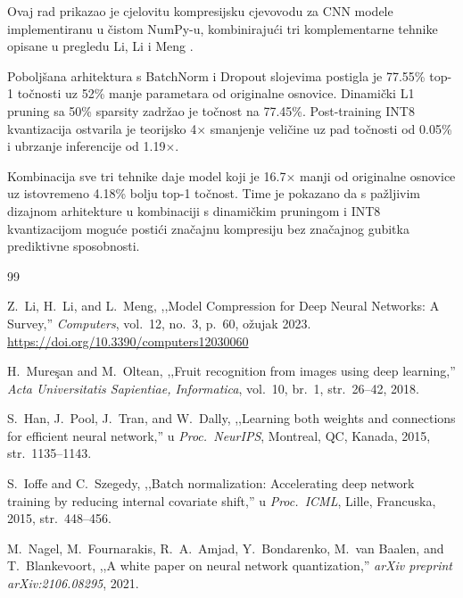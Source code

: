 \documentclass[letterpaper, 10 pt, conference]{ieeeconf}
\begin{document}
Ovaj rad prikazao je cjelovitu kompresijsku cjevovodu za CNN modele implementiranu u čistom NumPy-u, kombinirajući tri komplementarne tehnike opisane u pregledu Li, Li i Meng \cite{li2023survey}.

Poboljšana arhitektura s BatchNorm i Dropout slojevima postigla je 77.55\% top-1 točnosti uz 52\% manje parametara od originalne osnovice.
Dinamički L1 pruning sa 50\% sparsity zadržao je točnost na 77.45\%.
Post-training INT8 kvantizacija ostvarila je teorijsko 4$\times$ smanjenje veličine uz pad točnosti od 0.05\% i ubrzanje inferencije od 1.19$\times$.

Kombinacija sve tri tehnike daje model koji je 16.7$\times$ manji od originalne osnovice uz istovremeno 4.18\% bolju top-1 točnost.
Time je pokazano da s pažljivim dizajnom arhitekture u kombinaciji s dinamičkim pruningom i INT8 kvantizacijom moguće postići značajnu kompresiju bez značajnog gubitka prediktivne sposobnosti.


\begin{thebibliography}{99}

Z.\ Li, H.\ Li, and L.\ Meng,
,,Model Compression for Deep Neural Networks: A Survey,''
\textit{Computers}, vol.~12, no.~3, p.~60, ožujak 2023.
\url{https://doi.org/10.3390/computers12030060}

H.\ Mure\c{s}an and M.\ Oltean,
,,Fruit recognition from images using deep learning,''
\textit{Acta Universitatis Sapientiae, Informatica},
vol.~10, br.~1, str.~26--42, 2018.

S.\ Han, J.\ Pool, J.\ Tran, and W.\ Dally,
,,Learning both weights and connections for efficient neural network,''
u \textit{Proc.\ NeurIPS}, Montreal, QC, Kanada, 2015, str.~1135--1143.

S.\ Ioffe and C.\ Szegedy,
,,Batch normalization: Accelerating deep network training by reducing internal covariate shift,''
u \textit{Proc.\ ICML}, Lille, Francuska, 2015, str.~448--456.

M.\ Nagel, M.\ Fournarakis, R.\ A.\ Amjad, Y.\ Bondarenko,
M.\ van Baalen, and T.\ Blankevoort,
,,A white paper on neural network quantization,''
\textit{arXiv preprint arXiv:2106.08295}, 2021.

\end{thebibliography}
\end{document}
